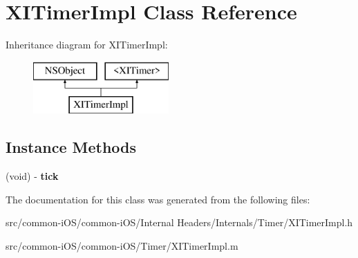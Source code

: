 \hypertarget{interface_x_i_timer_impl}{}\section{X\+I\+Timer\+Impl Class Reference}
\label{interface_x_i_timer_impl}
Inheritance diagram for X\+I\+Timer\+Impl\+:\begin{figure}[H]
\begin{center}
\leavevmode
\includegraphics[height=2.000000cm]{interface_x_i_timer_impl}
\end{center}
\end{figure}
\subsection*{Instance Methods}
\begin{DoxyCompactItemize}
\item 
\hypertarget{interface_x_i_timer_impl_aa2f972586a7c757a2fcdbc49a6da1201}{}\label{interface_x_i_timer_impl_aa2f972586a7c757a2fcdbc49a6da1201} 
(void) -\/ {\bfseries tick}
\end{DoxyCompactItemize}


The documentation for this class was generated from the following files\+:\begin{DoxyCompactItemize}
\item 
src/common-\/i\+O\+S/common-\/i\+O\+S/\+Internal Headers/\+Internals/\+Timer/X\+I\+Timer\+Impl.\+h\item 
src/common-\/i\+O\+S/common-\/i\+O\+S/\+Timer/X\+I\+Timer\+Impl.\+m\end{DoxyCompactItemize}
